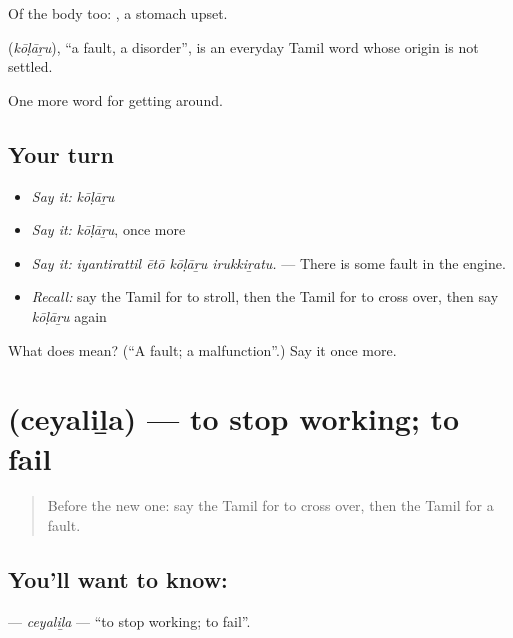 Of the body too:  , a stomach upset.

\begin{cousinweb}
\textbf{} (\emph{kōḷāṟu}), \textquotedblleft{}a fault, a disorder\textquotedblright{}, is an everyday Tamil word whose origin is not settled.
\end{cousinweb}

\begin{grammarlens}[title={What you've built}]
One more word for getting around.
\end{grammarlens}

\subsection*{Your turn}
\begin{itemize}
\raggedright
  \item \emph{Say it:} \emph{kōḷāṟu}
  \item \emph{Say it:} \emph{kōḷāṟu}, once more
  \item \emph{Say it:} \emph{iyantirattil ētō kōḷāṟu irukkiṟatu.} — There is some fault in the engine.
  \item \emph{Recall:} say the Tamil for to stroll, then the Tamil for to cross over, then say \emph{kōḷāṟu} again
\end{itemize}

\begin{tcolorbox}[breakable,colback=teal!4,colframe=teal!35!black,title={Before you move on}]
What does  mean? (\textquotedblleft{}A fault; a malfunction\textquotedblright{}.) Say it once more.
\end{tcolorbox}
\section[\texorpdfstring{\ta{செயலிழ} (ceyaliḻa)}{செயலிழ (ceyaliḻa)}]{ (ceyaliḻa) — to stop working; to fail}

\label{lesson:TA-C411-ceyalila}



\begin{quote}
Before the new one: say the Tamil for to cross over, then the Tamil for a fault.
\end{quote}

\subsection*{You'll want to know: }
\textbf{} — \emph{ceyaliḻa} — \textquotedblleft{}to stop working; to fail\textquotedblright{}.

